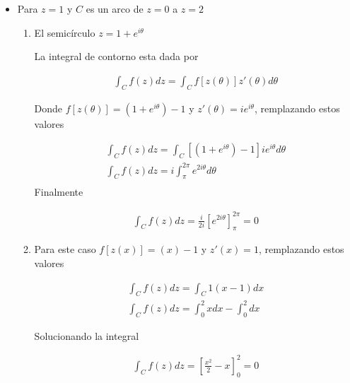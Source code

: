 \begin{itemize}
    \item Para $z = 1$ y $C$ es un arco de $z = 0$ a $z = 2$
    \begin{enumerate}
        \item  El semicírculo $z = 1 + e^{i\theta}$ 
        
        La integral de contorno esta dada por 

        \begin{gather*}
            \int_C f(z)dz = \int_C f[z(\theta)]z'(\theta)d\theta
        \end{gather*}


        Donde $f[z(\theta)] = (1 + e^{i\theta}) - 1$ y $z'(\theta) = ie^{i\theta}$, remplazando estos valores 

        \begin{gather*}
            \int_C f(z)dz = \int_C  [(1 + e^{i\theta}) - 1] ie^{i\theta}d\theta\\
            \int_C f(z)dz = i\int_\pi^{2\pi}  e^{2i\theta}d\theta\\
        \end{gather*}
        Finalmente 
        \begin{mdframed}
            \vspace{-0.25cm}
            \begin{gather}
                \int_C f(z)dz = \frac{i}{2i}\left[  e^{2i\theta}\right]_\pi^{2\pi} = 0
            \end{gather}    
            \vspace{-0.3cm}
        \end{mdframed}

        \item Para este caso $f[z(x)] = (x) - 1$ y $z'(x) = 1$, remplazando estos valores
        
        \begin{gather*}
            \int_C f(z)dz = \int_C  1(x - 1)dx\\
            \int_C f(z)dz = \int_0^2  xdx- \int_0^2dx 
        \end{gather*}

        Solucionando la integral 

        \begin{mdframed}
            \vspace{-0.25cm}
            \begin{gather}
                \int_C f(z)dz = \left[\frac{x^2}{2} - x\right]_0^{2} = 0
            \end{gather}    
            \vspace{-0.3cm}
        \end{mdframed}
    \end{enumerate}


\end{itemize}
